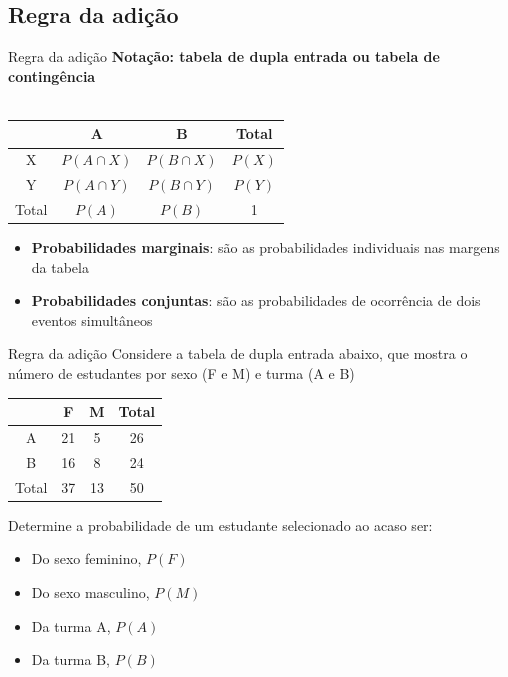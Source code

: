 \documentclass[10pt]{beamer}\usepackage[]{graphicx}\usepackage[]{color}
\theoremstyle{definition}
\begin{document}
\subsection{Regra da adição}

\begin{frame}[fragile]{Regra da adição}
  \textbf{Notação: tabela de dupla entrada ou tabela de contingência}\\~\\
  \begin{table}
    \centering
    \begin{tabular}{c|cc|c}
      \hline
      & A & B & Total \\
      \hline
      X & $P(A \cap X)$ & $P(B \cap X)$ & $P(X)$ \\
      Y & $P(A \cap Y)$ & $P(B \cap Y)$ & $P(Y)$ \\
      \hline
      Total & $P(A)$ & $P(B)$ & 1 \\
      \hline
    \end{tabular}
  \end{table}
  \begin{itemize}
  \item \textbf{Probabilidades marginais}: são as probabilidades
    individuais nas margens da tabela
  \item \textbf{Probabilidades conjuntas}: são as probabilidades de
    ocorrência de dois eventos simultâneos
  \end{itemize}
\end{frame}

\begin{frame}[fragile]{Regra da adição}
  Considere a tabela de dupla entrada abaixo, que mostra o número de
  estudantes por sexo (F e M) e turma (A e B)
  \begin{table}
    \centering
    \begin{tabular}{c|cc|c}
      \hline
      & F & M & Total \\
      \hline
      A & 21 & 5 & 26 \\
      B & 16 & 8 & 24 \\
      \hline
      Total & 37 & 13 & 50 \\
      \hline
    \end{tabular}
  \end{table}
  Determine a probabilidade de um estudante selecionado ao acaso ser:
  \begin{itemize}
  \item Do sexo feminino, $P(F)$
  \item Do sexo masculino, $P(M)$
  \item Da turma A, $P(A)$
  \item Da turma B, $P(B)$
  \end{itemize}
\end{frame}
\end{document}
